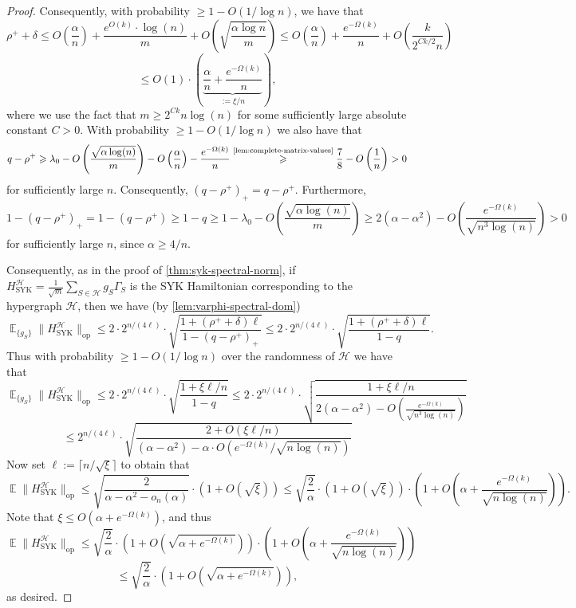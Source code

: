 \documentclass
[11pt,letterpaper]
{article}
\theoremstyle{definition}
\newcommand{\1}{\mathbf{1}}
\newcommand{\cH}{\mathcal H}
\DeclareMathOperator*{\E}{\mathbb{E}}
\renewcommand{\geq}{\geqslant}
\renewcommand{\leq}{\leqslant}
\begin{document}
\begin{proof}
   Consequently, with probability $\geq 1 - O(1/\log n)$, we have that 
   \[\rho^+ + \delta\leq O\left(\frac{\alpha}{n}\right) + \frac{e^{O(k)}\cdot\log(n)}{m} + O\left(\sqrt{\frac{\alpha\log n}{m}}\right)\leq O\left(\frac{\alpha}{n}\right) + \frac{e^{-\Omega(k)}}{n} + O\left(\frac{k}{2^{Ck/2}n}\right)\]
   \[\leq O(1)\cdot\left(\underbrace{\frac{\alpha}{n} + \frac{e^{-\Omega(k)}}{n}}_{:= \xi/n}\right),\]
   where we use the fact that $m\geq 2^{Ck}n\log(n)$ for some sufficiently large absolute constant $C > 0$. With probability $\geq 1 - O(1/\log n)$ we also have that 
   \[q - \rho^+\geq \lambda_0 - O\left(\frac{\sqrt{\alpha\log(n)}}{m}\right) - O\left(\frac{\alpha}{n}\right) - \frac{e^{-\Omega(k)}}{n}\overset{\text{\cref{lem:complete-matrix-values}}}{\geq}\frac{7}{8} - O\left(\frac{1}{n}\right) > 0\]
   for sufficiently large $n$. Consequently, $(q - \rho^+)_+ = q - \rho^+$. Furthermore, 
   \[1 - (q - \rho^+)_+ = 1 - (q - \rho^+)\geq 1 - q\geq 1 - \lambda_0 - O\left(\frac{\sqrt{\alpha\log(n)}}{m}\right)\geq 2(\alpha - \alpha^2) - O\left(\frac{e^{-\Omega(k)}}{\sqrt{n^3\log(n)}}\right) > 0\]
   for sufficiently large $n$, since $\alpha\geq 4/n$.

   Consequently, as in the proof of \cref{thm:syk-spectral-norm}, if $H^\cH_{\operatorname{SYK}} = \frac{1}{\sqrt{m}}\sum_{S\in\cH}g_S\Gamma_S$ is the SYK Hamiltonian corresponding to the hypergraph $\cH$, then we have (by \cref{lem:varphi-spectral-dom})
   \[\E_{\{g_S\}}\|H^\cH_{\operatorname{SYK}}\|_{\operatorname{op}}\leq 2\cdot 2^{n/(4\ell)}\cdot\sqrt{\frac{1 + (\rho^+ + \delta)\ell}{1 - (q - \rho^+)_+}}\leq 2\cdot 2^{n/(4\ell)}\cdot\sqrt{\frac{1 + (\rho^+ + \delta)\ell}{1 - q}}. \]
   Thus with probability $\geq 1 - O(1/\log n)$ over the randomness of $\cH$ we have that 
   \[\E_{\{g_S\}}\|H^\cH_{\operatorname{SYK}}\|_{\operatorname{op}}\leq 2\cdot 2^{n/(4\ell)}\cdot\sqrt{\frac{1 + \xi\ell/n}{1 - q}}\leq 2\cdot 2^{n/(4\ell)}\cdot\sqrt{\frac{1 + \xi\ell/n}{2(\alpha - \alpha^2) - O\left(\frac{e^{-\Omega(k)}}{\sqrt{n^3\log(n)}}\right)}}\]
   \[\leq 2^{n/(4\ell)}\cdot\sqrt{\frac{2 + O(\xi\ell/n)}{(\alpha - \alpha^2) - \alpha\cdot O(e^{-\Omega(k)}/\sqrt{n\log(n)})}}\]
   Now set $\ell:= \lceil n/\sqrt{\xi}\rceil$ to obtain that 
   \[\E\|H^\cH_{\operatorname{SYK}}\|_{\operatorname{op}}\leq\sqrt{\frac{2}{\alpha - \alpha^2 - o_n(\alpha)}}\cdot(1 + O(\sqrt{\xi}))\leq \sqrt{\frac{2}{\alpha}}\cdot(1 + O(\sqrt{\xi}))\cdot\left(1 + O\left(\alpha + \frac{e^{-\Omega(k)}}{\sqrt{n\log(n)}}\right)\right).\]
   Note that $\xi\leq O(\alpha + e^{-\Omega(k)})$, and thus 
   \[\E\|H^\cH_{\operatorname{SYK}}\|_{\operatorname{op}}\leq \sqrt{\frac{2}{\alpha}}\cdot(1 + O(\sqrt{\alpha + e^{-\Omega(k)}}))\cdot\left(1 + O\left(\alpha + \frac{e^{-\Omega(k)}}{\sqrt{n\log(n)}}\right)\right)\] 
   \[\leq\sqrt{\frac{2}{\alpha}}\cdot\left(1 + O\left(\sqrt{\alpha + e^{-\Omega(k)}}\right)\right),\]
   as desired.
\end{proof}
\end{document}
